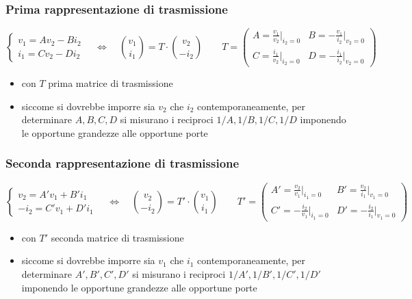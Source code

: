 \documentclass[a4paper]{article}
\begin{document}
\subsubsection*{Prima rappresentazione di trasmissione}
\[\begin{cases}
	v_1 = A v_2 - B i_2 \\
	i_1 = C v_2 - D i_2
\end{cases} \quad \Leftrightarrow \quad
\binom{v_1}{i_1} = T \cdot \binom{v_2}{-i_2} \qquad
T = \left( \begin{matrix}
	A = \frac{v_1}{v_2} \Big|_{i_2=0} & B = -\frac{v_1}{i_2} \Big|_{v_2=0} \\[8pt]
	C = \frac{i_1}{v_2} \Big|_{i_2=0} & D = -\frac{i_1}{i_2} \Big|_{v_2=0}
\end{matrix} \right)\]
\begin{itemize}
	\item con \(T\) prima matrice di trasmissione
	\item siccome si dovrebbe imporre sia \(v_2\) che \(i_2\) contemporaneamente, per determinare \(A, B, C, D\) si misurano
	i reciproci \(1/A, 1/B, 1/C, 1/D\) imponendo le opportune grandezze alle opportune porte
\end{itemize}

\subsubsection*{Seconda rappresentazione di trasmissione}
\[\begin{cases}
	v_2 = A' v_1 + B' i_1 \\
	-i_2 = C' v_1 + D' i_1
\end{cases} \quad \Leftrightarrow \quad
\binom{v_2}{-i_2} = T' \cdot \binom{v_1}{i_1} \qquad
T' = \left( \begin{matrix}
	A' = \frac{v_2}{v_1} \Big|_{i_1=0} & B' = \frac{v_2}{i_1} \Big|_{v_1=0} \\[8pt]
	C' = -\frac{i_2}{v_1} \Big|_{i_1=0} & D' = -\frac{i_2}{i_1} \Big|_{v_1=0}
\end{matrix} \right)\]
\begin{itemize}
	\item con \(T'\) seconda matrice di trasmissione
	\item siccome si dovrebbe imporre sia \(v_1\) che \(i_1\) contemporaneamente, per determinare \(A', B', C', D'\) si misurano
	i reciproci \(1/A', 1/B', 1/C', 1/D'\) imponendo le opportune grandezze alle opportune porte
\end{itemize}
\end{document}
